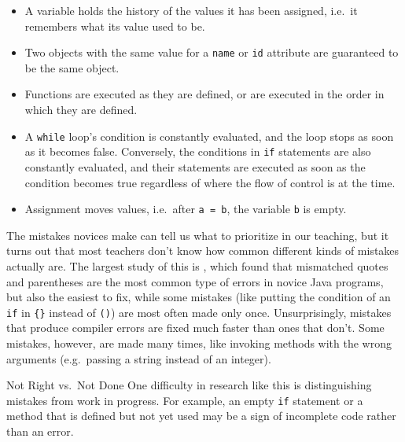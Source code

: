\begin{itemize}

\item
  A variable holds the history of the values it has been assigned,
  i.e.\ it remembers what its value used to be.

\item
  Two objects with the same value for a \texttt{name} or \texttt{id} attribute
  are guaranteed to be the same object.

\item
  Functions are executed as they are defined,
  or are executed in the order in which they are defined.

\item
  A \texttt{while} loop's condition is constantly evaluated,
  and the loop stops as soon as it becomes false.
  Conversely,
  the conditions in \texttt{if} statements are also constantly evaluated,
  and their statements are executed as soon as the condition becomes true
  regardless of where the flow of control is at the time.

\item
  Assignment moves values,
  i.e.\ after \texttt{a\ =\ b}, the variable \texttt{b} is empty.

\end{itemize}


The mistakes novices make can tell us what to prioritize in our teaching,
but it turns out that most teachers don't know how common different kinds of mistakes actually are.
The largest study of this is \cite{Brow2017},
which found that mismatched quotes and parentheses are the most common type of errors in novice Java programs,
but also the easiest to fix,
while some mistakes (like putting the condition of an \texttt{if} in \texttt{\{\}} instead of \texttt{()})
are most often made only once.
Unsurprisingly,
mistakes that produce compiler errors are fixed much faster than ones that don't.
Some mistakes,
however,
are made many times,
like invoking methods with the wrong arguments
(e.g.\ passing a string instead of an integer).

\begin{aside}{Not Right vs.\ Not Done}
  One difficulty in research like this is distinguishing mistakes from work in progress.
  For example,
  an empty \texttt{if} statement or a method that is defined but not yet used
  may be a sign of incomplete code rather than an error.
\end{aside}


